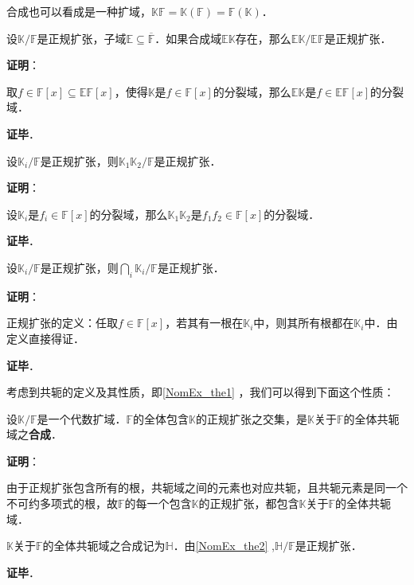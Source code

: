合成也可以看成是一种扩域，$\mathbb{K}\mathbb{F}=\mathbb{K}(\mathbb{F})=\mathbb{F}(\mathbb{K})$．


\begin{theorem}{}
设$\mathbb{K}/\mathbb{F}$是正规扩张，子域$\mathbb{E}\subseteq\overline{\mathbb{F}}$．如果合成域$\mathbb{EK}$存在，那么$\mathbb{EK}/\mathbb{EF}$是正规扩张．
\end{theorem}

\textbf{证明}：

取$f\in\mathbb{F}[x]\subseteq\mathbb{EF}[x]$，使得$\mathbb{K}$是$f\in\mathbb{F}[x]$的分裂域，那么$\mathbb{EK}$是$f\in\mathbb{EF}[x]$的分裂域．

\textbf{证毕}．






\begin{theorem}{}
设$\mathbb{K}_i/\mathbb{F}$是正规扩张，则$\mathbb{K}_1\mathbb{K}_2/\mathbb{F}$是正规扩张．
\end{theorem}


\textbf{证明}：

设$\mathbb{K}_i$是$f_i\in\mathbb{F}[x]$的分裂域，那么$\mathbb{K}_1\mathbb{K}_2$是$f_1f_2\in\mathbb{F}[x]$的分裂域．

\textbf{证毕}．


\begin{theorem}{}\label{NomEx_the2}
设$\mathbb{K}_i/\mathbb{F}$是正规扩张，则$\bigcap_{i}\mathbb{K}_i/\mathbb{F}$是正规扩张．
\end{theorem}

\textbf{证明}：

正规扩张的定义：任取$f\in\mathbb{F}[x]$，若其有一根在$\mathbb{K}_i$中，则其所有根都在$\mathbb{K}_i$中．由定义直接得证．

\textbf{证毕}．


考虑到共轭的定义及其性质，即\autoref{NomEx_the1} ，我们可以得到下面这个性质：

\begin{theorem}{}
设$\mathbb{K}/\mathbb{F}$是一个代数扩域．$\mathbb{F}$的全体包含$\mathbb{K}$的正规扩张之交集，是$\mathbb{K}$关于$\mathbb{F}$的全体共轭域之\textbf{合成}．
\end{theorem}

\textbf{证明}：

由于正规扩张包含所有的根，共轭域之间的元素也对应共轭，且共轭元素是同一个不可约多项式的根，故$\mathbb{F}$的每一个包含$\mathbb{K}$的正规扩张，都包含$\mathbb{K}$关于$\mathbb{F}$的全体共轭域．

$\mathbb{K}$关于$\mathbb{F}$的全体共轭域之合成记为$\mathbb{H}$．由\autoref{NomEx_the2} ,$\mathbb{H}/\mathbb{F}$是正规扩张．

\textbf{证毕}．

















